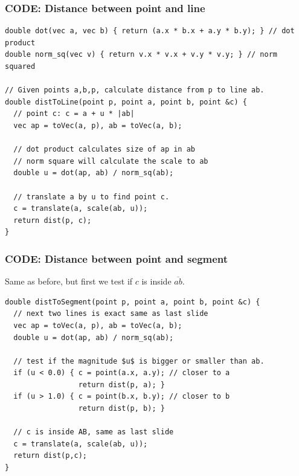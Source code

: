 \begin{frame}[fragile]
  \frametitle{CODE: Distance between point and line}

  {\smaller
  \begin{exampleblock}{}
\begin{verbatim}
double dot(vec a, vec b) { return (a.x * b.x + a.y * b.y); } // dot product
double norm_sq(vec v) { return v.x * v.x + v.y * v.y; } // norm squared

// Given points a,b,p, calculate distance from p to line ab.
double distToLine(point p, point a, point b, point &c) {
  // point c: c = a + u * |ab|
  vec ap = toVec(a, p), ab = toVec(a, b);

  // dot product calculates size of ap in ab
  // norm square will calculate the scale to ab
  double u = dot(ap, ab) / norm_sq(ab);

  // translate a by u to find point c.
  c = translate(a, scale(ab, u));
  return dist(p, c);
}
\end{verbatim}
  \end{exampleblock}

}
\end{frame}

\begin{frame}[fragile]
  \frametitle{CODE: Distance between point and segment}
  Same as before, but first we test if $c$ is inside $\overline{ab}$.

  {\smaller
    \begin{exampleblock}{}
\begin{verbatim}
double distToSegment(point p, point a, point b, point &c) {
  // next two lines is exact same as last slide
  vec ap = toVec(a, p), ab = toVec(a, b);
  double u = dot(ap, ab) / norm_sq(ab);

  // test if the magnitude $u$ is bigger or smaller than ab.
  if (u < 0.0) { c = point(a.x, a.y); // closer to a
                 return dist(p, a); }
  if (u > 1.0) { c = point(b.x, b.y); // closer to b
                 return dist(p, b); }

  // c is inside AB, same as last slide
  c = translate(a, scale(ab, u));
  return dist(p,c);
}
\end{verbatim}
    \end{exampleblock}
  }
\end{frame}

